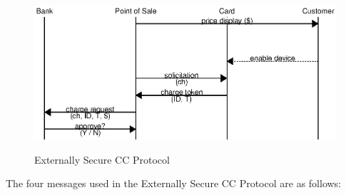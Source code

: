 \begin{figure}[h!]
  \caption{Externally Secure CC Protocol}
  \centering
    \includegraphics{img/external_ccp.eps}
  \label{fig:external-ccp}
\end{figure}

The four messages used in the Externally Secure CC Protocol are as follows:

